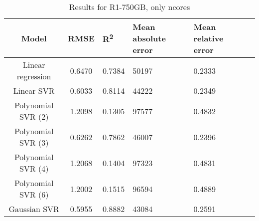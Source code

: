 \begin{table}[H]
\centering
\begin{adjustbox}{center}
\begin{tabular}{c | c M{1.2cm} M{2.5cm} M{2.5cm} M{1.8cm}}
Model & RMSE & R\textsuperscript{2} & Mean absolute error & Mean relative error \tabularnewline
\hline
Linear regression & 0.6470 & 0.7384 &  50197 & 0.2333 \\
Linear SVR & 0.6033 & 0.8114 &  44222 & 0.2349 \\
Polynomial SVR (2) & 1.2098 & 0.1305 &  97577 & 0.4832 \\
Polynomial SVR (3) & 0.6262 & 0.7862 &  46007 & 0.2396 \\
Polynomial SVR (4) & 1.2068 & 0.1404 &  97323 & 0.4831 \\
Polynomial SVR (6) & 1.2002 & 0.1515 &  96594 & 0.4889 \\
Gaussian SVR & 0.5955 & 0.8882 &  43084 & 0.2591 \\
\end{tabular}
\end{adjustbox}
\\
\caption{Results for R1-750GB, only ncores}
\label{tab:only_1_linear_R1_750}
\end{table}
